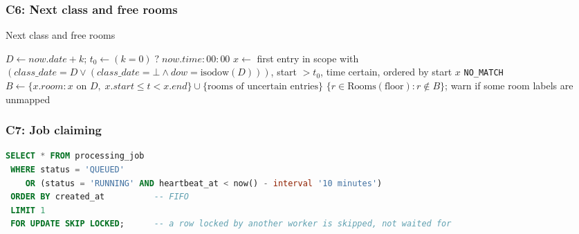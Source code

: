 \subsubsection{C6: Next class and free rooms}
\begin{algorithm}[H]
\caption{Next class and free rooms}\label{alg:next}
\begin{algorithmic}[1]
   
     \State $D \gets \mathit{now}.\mathit{date}+k$;\; $t_0 \gets (k=0)\;?\;\mathit{now}.\mathit{time} : 00{:}00$
     \State $x \gets$ first entry in scope with $(\mathit{class\_date}=D \vee (\mathit{class\_date}=\bot \wedge \mathit{dow}=\mathrm{isodow}(D)))$, start $> t_0$, time certain, ordered by start
      \Return $x$ \EndIf
  \EndFor
  \State \Return \texttt{NO\_MATCH}
\EndFunction
{}
  \State $B \gets \{x.\mathit{room} : x \text{ on } D,\; x.\mathit{start} \le t < x.\mathit{end}\} \cup \{\text{rooms of uncertain entries}\}$ 
  \State \Return $\{r \in \text{Rooms}(\text{floor}) : r \notin B\}$; warn if some room labels are unmapped
\EndFunction
\end{algorithmic}
\end{algorithm}

\subsubsection{C7: Job claiming}
\begin{lstlisting}[language=SQL,caption={Job claim executed by every worker (simplified)},label=lst:claim]
SELECT * FROM processing_job
 WHERE status = 'QUEUED'
    OR (status = 'RUNNING' AND heartbeat_at < now() - interval '10 minutes')
 ORDER BY created_at          -- FIFO
 LIMIT 1
 FOR UPDATE SKIP LOCKED;      -- a row locked by another worker is skipped, not waited for
\end{lstlisting}

